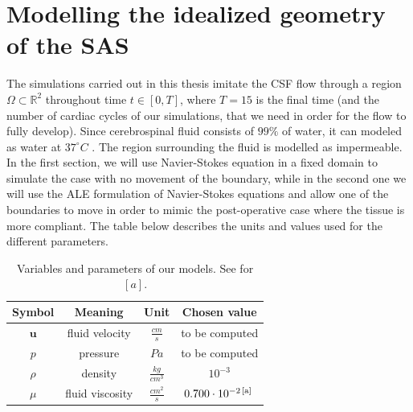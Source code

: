 \documentclass[a4paper,11pt,oneside]{book}
\begin{document}
\newpage

\section{Modelling the idealized geometry of the SAS}
\label{sec:sas}



The simulations carried out in this thesis imitate the CSF flow through a region $\Omega \subset \mathbb{R}^2$ throughout time $t \in [0, T]$, where $T=15$ is the final time (and the number of cardiac cycles of our simulations, that we need in order for the flow to fully develop). Since cerebrospinal fluid consists of $99 \% $ of water, it can modeled as water at $37^{\circ} C$ \cite{linge1}. The region surrounding the fluid is modelled as impermeable.
In the first section, we will use Navier-Stokes equation in a fixed domain to simulate the case with no movement of the boundary, while in the second one we will use the ALE formulation of Navier-Stokes equations and allow one of the boundaries to move in order to mimic the post-operative case where the tissue is more compliant. The table below describes the units and values used for the different parameters.

\begin{table}[h!]
\begin{center}
\begin{tabular}{| c | c | c | c |}
\hline
\textbf{Symbol} & \textbf{Meaning} & \textbf{Unit} & \textbf{Chosen value} \\
\hline
$\mathbf{u}$ & fluid velocity & $\frac{cm}{s}$ & to be computed \\
\hline
$p$ & pressure & $Pa$ & to be computed \\
\hline
$\rho$ & density & $\frac{kg}{cm^3}$ & $10^{-3}$ \\
\hline
$\mu$ & fluid viscosity & $\frac{cm^2}{s}$ & $0.700 \cdot 10^{-2 \, [\rm a] \, }$ \\
\hline
\end{tabular}
\end{center}
\caption{Variables and parameters of our models. See \cite{linge1} for $[a]$.}
\end{table}
\end{document}

